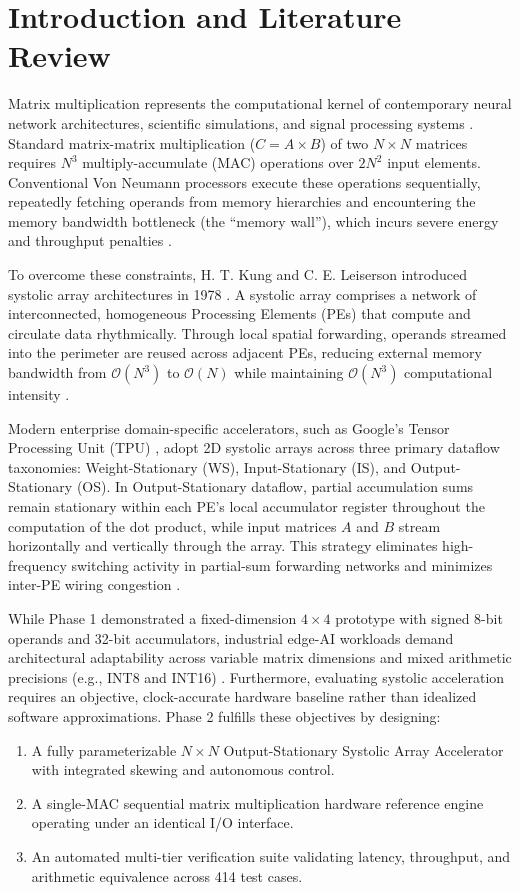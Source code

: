 \documentclass[conference]{IEEEtran}
\begin{document}
\section{Introduction and Literature Review}
Matrix multiplication represents the computational kernel of contemporary neural network architectures, scientific simulations, and signal processing systems \cite{jouppi2017}. Standard matrix-matrix multiplication ($C = A \times B$) of two $N \times N$ matrices requires $N^3$ multiply-accumulate (MAC) operations over $2N^2$ input elements. Conventional Von Neumann processors execute these operations sequentially, repeatedly fetching operands from memory hierarchies and encountering the memory bandwidth bottleneck (the ``memory wall''), which incurs severe energy and throughput penalties \cite{patterson2020}.

To overcome these constraints, H. T. Kung and C. E. Leiserson introduced systolic array architectures in 1978 \cite{kung1978}. A systolic array comprises a network of interconnected, homogeneous Processing Elements (PEs) that compute and circulate data rhythmically. Through local spatial forwarding, operands streamed into the perimeter are reused across adjacent PEs, reducing external memory bandwidth from $\mathcal{O}(N^3)$ to $\mathcal{O}(N)$ while maintaining $\mathcal{O}(N^3)$ computational intensity \cite{kung1978}.

Modern enterprise domain-specific accelerators, such as Google's Tensor Processing Unit (TPU) \cite{jouppi2017}, adopt 2D systolic arrays across three primary dataflow taxonomies: Weight-Stationary (WS), Input-Stationary (IS), and Output-Stationary (OS). In Output-Stationary dataflow, partial accumulation sums remain stationary within each PE's local accumulator register throughout the computation of the dot product, while input matrices $A$ and $B$ stream horizontally and vertically through the array. This strategy eliminates high-frequency switching activity in partial-sum forwarding networks and minimizes inter-PE wiring congestion \cite{jouppi2017}.

While Phase 1 demonstrated a fixed-dimension $4\times 4$ prototype with signed 8-bit operands and 32-bit accumulators, industrial edge-AI workloads demand architectural adaptability across variable matrix dimensions and mixed arithmetic precisions (e.g., INT8 and INT16) \cite{patterson2020}. Furthermore, evaluating systolic acceleration requires an objective, clock-accurate hardware baseline rather than idealized software approximations. Phase 2 fulfills these objectives by designing:
\begin{enumerate}
    \item A fully parameterizable $N \times N$ Output-Stationary Systolic Array Accelerator with integrated skewing and autonomous control.
    \item A single-MAC sequential matrix multiplication hardware reference engine operating under an identical I/O interface.
    \item An automated multi-tier verification suite validating latency, throughput, and arithmetic equivalence across 414 test cases.
\end{enumerate}
\end{document}
